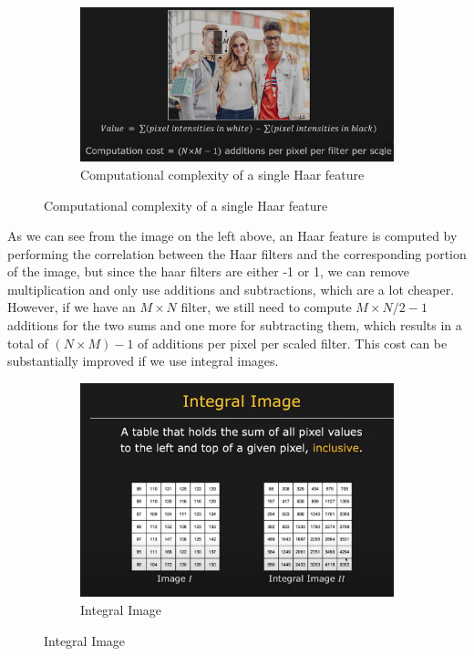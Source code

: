 \documentclass[12pt,a4paper]{article}
\begin{document}
\begin{large}
\begin{figure} [!hbp]
\begin{subfigure}[b]{0.3\textwidth}
    \end{subfigure}
    \hspace{0.1cm}
    \begin{subfigure}[b]{0.4\textwidth}
    \centering
    \captionsetup{justification=centering}
      \includegraphics[width=\textwidth]{images/haar5.png}
      \caption{Computational complexity of a single Haar feature}
      
    \end{subfigure}
  \end{figure}
As we can see from the image on the left above, an Haar feature is computed by performing the correlation between the Haar filters and the corresponding portion of the image, but since the haar filters are either -1 or 1, we can remove multiplication and only use additions and subtractions, which are a lot cheaper. However, if we have an $M\times N$ filter, we still need to compute $M\times N/2-1$ additions for the two sums and one more for subtracting them, which results in a total of $(N\times M)-1$ of additions per pixel per scaled filter.
This cost can be substantially improved if we use integral images.
\begin{figure} [!h]
  \centering
    \begin{subfigure}[b]{0.4\textwidth}
      \centering
      \captionsetup{justification=centering}
        \includegraphics[width=\textwidth]{images/haar6.png}
        \caption{Integral Image}
        

\end{subfigure}
\end{figure}
\end{large}
\end{document}
